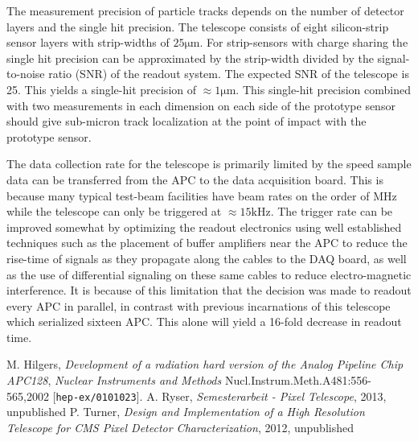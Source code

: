 \documentclass{PoS}
\newcommand{\micron}{\si{\micro\meter}}
\begin{document}
The measurement precision of particle tracks depends on the number of detector
layers and the single hit precision. The telescope consists of eight
silicon-strip sensor layers with strip-widths of $25\micron$. For strip-sensors
with charge sharing the single hit precision can be approximated by the
strip-width divided by the signal-to-noise ratio (SNR) of the readout system.
The expected SNR of the telescope is 25\cite{Ryser2013}. This yields a single-hit precision of
$\approx1\micron$. This single-hit precision combined with two measurements in
each dimension on each side of the prototype sensor should give sub-micron
track localization at the point of impact with the prototype sensor.

The data collection rate for the telescope is primarily limited by the speed
sample data can be transferred from the APC to the data acquisition
board. This is because many typical test-beam facilities have beam rates
on the order of \si{\mega\hertz} while the telescope can only be triggered at
$\approx15\si{\kilo\hertz}$. The trigger rate can be improved somewhat by
optimizing the readout electronics using well established techniques such as
the placement of buffer amplifiers near the APC to reduce the rise-time
of signals as they propagate along the cables to the DAQ board, as well as
the use of differential signaling on these same cables to reduce
electro-magnetic interference. It is because of this limitation that the
decision was made to readout every APC in parallel, in contrast with
previous incarnations of this telescope which serialized sixteen
APC\cite{Turner2012}. This alone will yield a 16-fold decrease in readout time.

\begin{thebibliography}{99}
M. Hilgers,
\emph{Development of a radiation hard version of the Analog Pipeline Chip APC128},
\emph{Nuclear Instruments and Methods} Nucl.Instrum.Meth.A481:556-565,2002
[{\tt hep-ex/0101023}].
A. Ryser,
\emph{Semesterarbeit \-- Pixel Telescope},
2013, unpublished
P. Turner,
\emph{Design and Implementation of a High Resolution Telescope for CMS Pixel Detector Characterization},
2012, unpublished
\end{thebibliography}
\end{document}
